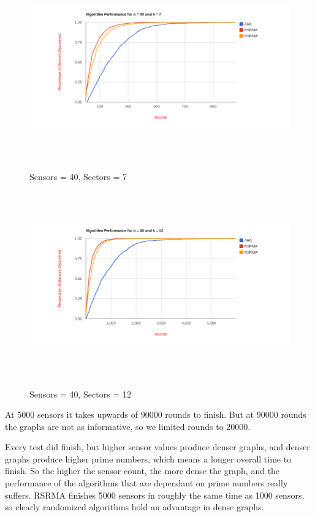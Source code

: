 \begin{figure}[ht]
\caption{Sensors = 40, Sectors = 7}
\includegraphics[height = 8cm]{pics/graph40k7.png}\\[0.5cm]   
\label{fig:n40k7} 
\end{figure}

\begin{figure}[ht]
\caption{Sensors = 40, Sectors = 12}
\includegraphics[height = 8cm]{pics/graph40k12.png}\\[0.5cm] 
\label{fig:n40k12}   
\end{figure}

At 5000 sensors it takes upwards of 90000 rounds to finish. But at 90000 rounds the graphs are not as informative, so we limited rounds to 20000. 

Every test did finish, but higher sensor values produce denser graphs, and denser graphs produce higher prime numbers, which means a longer overall time to finish. So the higher the sensor count, the more dense the graph, and the performance of the algorithms that are dependant on prime numbers really suffers. RSRMA finishes 5000 sensors in roughly the same time as 1000 sensors, so clearly randomized algorithms hold an advantage in dense graphs.


